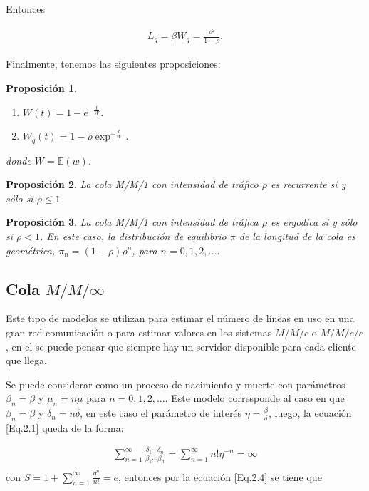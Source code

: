 \documentclass{article}
\newtheorem{Prop}{Proposición}
\newcommand{\esp}{\mathbb{E}}
\begin{document}
Entonces

\begin{eqnarray*}
L_{q}=\beta W_{q}=\frac{\rho^{2}}{1-\rho}.
\end{eqnarray*}

Finalmente, tenemos las siguientes proposiciones:

\begin{Prop}
\begin{enumerate}
\item $W\left(t\right)=1-e^{-\frac{t}{W}}$.
\item $W_{q}\left(t\right)=1-\rho\exp^{-\frac{t}{W}}$.
\end{enumerate}
donde $W=\esp(w)$.
\end{Prop}

\begin{Prop}
La cola M/M/1 con intensidad de tr\'afico $\rho$ es recurrente si
y s\'olo si $\rho\leq1$
\end{Prop}

\begin{Prop}
La cola M/M/1 con intensidad de tr\'afica $\rho$ es ergodica si y
s\'olo si $\rho<1$. En este caso, la distribuci\'on de equilibrio
$\pi$ de la longitud de la cola es geom\'etrica,
$\pi_{n}=\left(1-\rho\right)\rho^{n}$, para $n=0,1,2,\ldots$.
\end{Prop}
%
\subsection{Cola $M/M/\infty$}
%

Este tipo de modelos se utilizan para estimar el n\'umero de l\'ineas en uso en una gran red comunicaci\'on o para estimar valores en los sistemas $M/M/c$ o $M/M/c/c$, en el se puede pensar que siempre hay un servidor disponible para cada cliente que llega.

Se puede considerar como un proceso de nacimiento y muerte con par\'ametros $\beta_{n}=\beta$ y $\mu_{n}=n\mu$ para $n=0,1,2,\ldots$. Este modelo corresponde al caso en que $\beta_{n}=\beta$ y $\delta_{n}=n\delta$, en este caso el par\'ametro de inter\'es $\eta=\frac{\beta}{\delta}$, luego, la ecuaci\'on \ref{Eq.2.1} queda de la forma:

\begin{eqnarray*}
\sum_{n=1}^{\infty}\frac{\delta_{1}\cdots\delta_{n}}{\beta_{1}\cdots\beta_{n}}=\sum_{n=1}^{\infty}n!\eta^{-n}=\infty\\
\end{eqnarray*}
con $S=1+\sum_{n=1}^{\infty}\frac{\eta^{n}}{n!}=e$, entonces por la ecuaci\'on \ref{Eq.2.4} se tiene que
\end{document}
